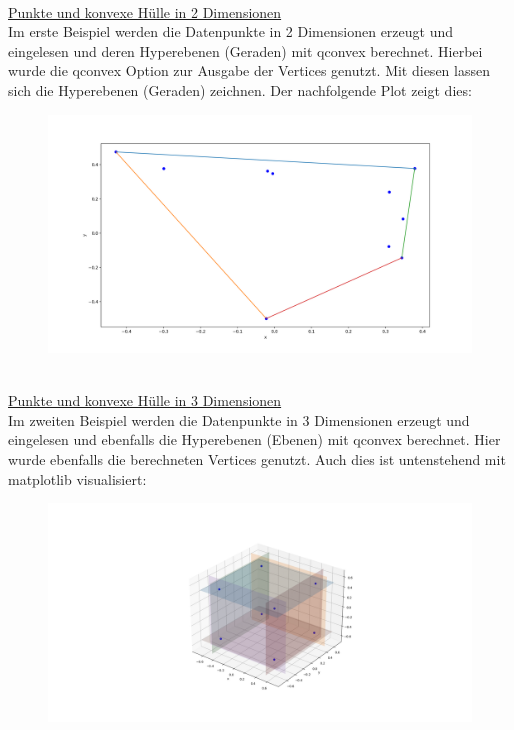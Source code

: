 \documentclass[12pt]{scrartcl}
\begin{document}
\ \\
\underline{Punkte und konvexe Hülle in 2 Dimensionen}\ \\
Im erste Beispiel werden die Datenpunkte in 2 Dimensionen erzeugt und eingelesen und deren Hyperebenen (Geraden) mit qconvex berechnet. Hierbei wurde die qconvex Option zur Ausgabe der Vertices genutzt. Mit diesen lassen sich die Hyperebenen (Geraden) zeichnen. Der nachfolgende Plot zeigt dies:
\begin{figure}[ht]
    \centering
    \includegraphics[scale=0.3]{2D_plot.png}
\end{figure}
\ \\
\underline{Punkte und konvexe Hülle in 3 Dimensionen}\ \\
Im zweiten Beispiel werden die Datenpunkte in 3 Dimensionen erzeugt und eingelesen und ebenfalls die Hyperebenen (Ebenen) mit qconvex berechnet. Hier wurde ebenfalls die berechneten Vertices genutzt. Auch dies ist untenstehend mit matplotlib visualisiert:
\begin{figure}[ht]
    \centering
    \includegraphics[scale=0.3]{cubeplot.png}
\end{figure}
\end{document}
